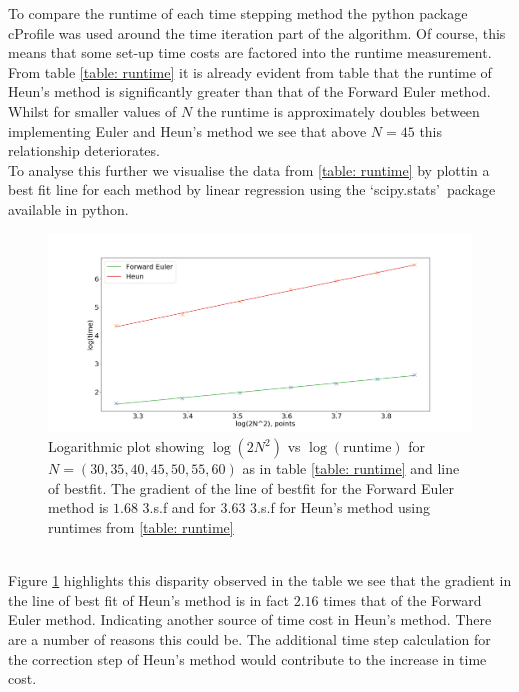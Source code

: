 To compare the runtime of each time stepping method the python package cProfile was used around the time iteration part of the algorithm. Of course, this means that some set-up time costs are factored into the runtime measurement. From table \ref{table: runtime} it is already evident from table that the runtime of Heun's method is significantly greater than that of the Forward Euler method. Whilst for smaller values of $N$ the runtime is approximately doubles between implementing Euler and Heun's method we see that above $N = 45$ this relationship deteriorates.
\\
\linebreak 
To analyse this further we visualise the data from \ref{table: runtime} by plottin a best fit line for each method by linear regression using the \textquoteleft scipy.stats\textquoteright \ package available in python. 
\begin{figure}[h!]
	\centering
	\includegraphics[width=0.95\linewidth]{evaluation/performance_loglog_plot}
	\caption[Time stepping performance based on number of points initialised in the domain]{Logarithmic plot showing $\log(2N^2)$ vs $\log(\textrm{runtime})$ for $N = (30,35,40,45,50,55,60)$ as in table \ref{table: runtime} and line of bestfit. The gradient of the line of bestfit for the Forward Euler method is $1.68$ 3.s.f and for $3.63$ 3.s.f for Heun's method using runtimes from \ref{table: runtime}}
	\label{fig:performanceloglogplot}
\end{figure}
\\
\linebreak
Figure \ref{fig:performanceloglogplot} highlights this disparity observed in the table we see that the gradient in the line of best fit of Heun's method is in fact $2.16$ times that of the Forward Euler method. Indicating another source of time cost in Heun's method. There are a number of reasons this could be. The additional time step calculation for the correction step of Heun's method would contribute to the increase in time cost. 
